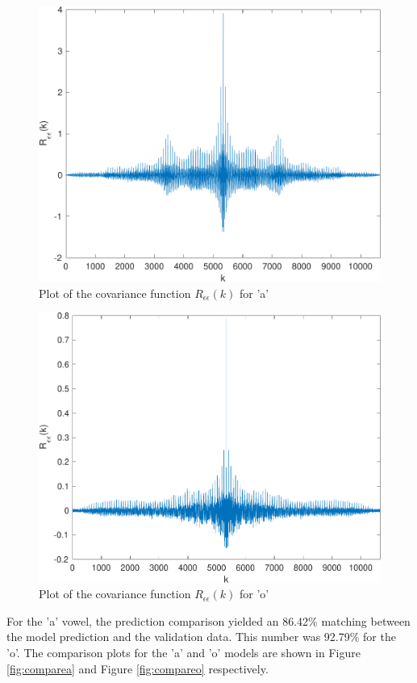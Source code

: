 \documentclass{IEEEtran}
\begin{document}
\begin{figure}[h!]
    \centering
    \captionsetup{justification=centering}
    \includegraphics[width=0.8\columnwidth]{pictures/acorr_a.pdf}
    \caption{Plot of the covariance function $R_{\epsilon\epsilon}(k)$ for 'a'}
    \label{fig:acorra}
\end{figure}

\begin{figure}[h!]
    \centering
    \captionsetup{justification=centering}
    \includegraphics[width=0.8\columnwidth]{pictures/acorr_o.pdf}
    \caption{Plot of the covariance function $R_{\epsilon\epsilon}(k)$ for 'o'}
    \label{fig:acorro}
\end{figure}

For the 'a' vowel, the prediction comparison yielded an 86.42\% matching
between the model prediction and the validation data. This number was 92.79\%
for the 'o'. The comparison plots for
the 'a' and 'o' models are shown in Figure \ref{fig:comparea} and Figure
\ref{fig:compareo} respectively.
\end{document}
